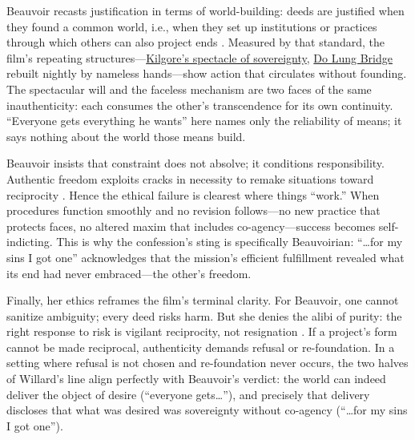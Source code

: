 Beauvoir recasts justification in terms of world-building: deeds are justified when they found
a common world, i.e., when they set up institutions or practices through which others can also
project ends \parencite[pp.~145--153]{Beauvoir1976}. Measured by that standard, the film's
repeating structures—\hyperref[scene:kilgore-beach]{Kilgore's spectacle of sovereignty},
\hyperref[scene:do-lung-bridge]{Do Lung Bridge} rebuilt nightly by nameless hands—show action
that circulates without founding. The spectacular will and the
faceless mechanism are two faces of the same inauthenticity: each consumes the other's
transcendence for its own continuity. ``Everyone gets everything he wants'' here names only the
reliability of means; it says nothing about the world those means build.

Beauvoir insists that constraint does not absolve; it conditions responsibility. Authentic
freedom exploits cracks in necessity to remake situations toward reciprocity
\parencite[pp.~34--42]{Beauvoir1976}. Hence the ethical failure is clearest where things
``work.'' When procedures function smoothly and no revision follows—no new practice that
protects faces, no altered maxim that includes co-agency—success becomes self-indicting. This is
why the confession's sting is specifically Beauvoirian: ``\ldots for my sins I got one''
acknowledges that the mission's efficient fulfillment revealed what its end had never
embraced—the other's freedom.

Finally, her ethics reframes the film's terminal clarity. For Beauvoir, one cannot sanitize
ambiguity; every deed risks harm. But she denies the alibi of purity: the right response to risk
is vigilant reciprocity, not resignation \parencite[pp.~139--147]{Beauvoir1976}. If a project's
form cannot be made reciprocal, authenticity demands refusal or re-foundation. In a setting
where refusal is not chosen and re-foundation never occurs, the two halves of Willard's line
align perfectly with Beauvoir's verdict: the world can indeed deliver the object of desire
(``everyone gets\ldots''), and precisely that delivery discloses that what was desired was
sovereignty without co-agency (``\ldots for my sins I got one'').
